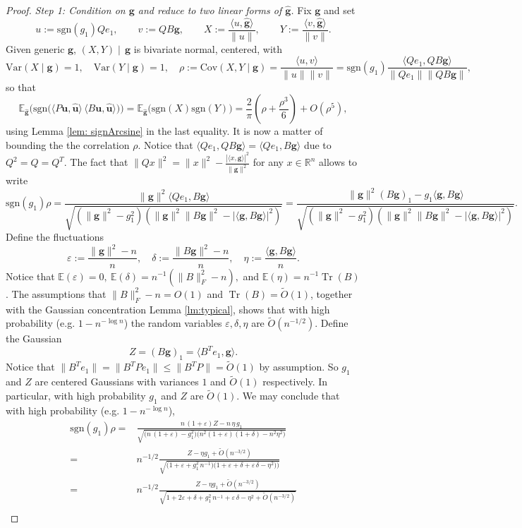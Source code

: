 \documentclass[reqno]{amsart}
\numberwithin{equation}{section}
\newcommand\E{\mathbb{E}}
\newcommand\R{\mathbb{R}}
\newcommand\bg{\bm{g}}
\newcommand\hg{\hat{\bm g}}
\newcommand\rem{\tilde{O}\left(n^{-3/2}\right)}
\newcommand\bu{\bm{u}}
\newcommand\hu{\hat{\bm u}}
\newcommand\eps{\varepsilon}
\newcommand\Tr{{\operatorname{Tr}}}
\newcommand{\Var}{\mathrm{Var}}
\newcommand{\Cov}{\mathrm{Cov}}
\begin{document}
\begin{proof}
\emph{Step 1: Condition on $\bg$ and reduce to two linear forms of $\hg$.}
Fix $\bg$ and set
\[
u:=\mathrm{sgn}(g_1)Qe_1,\qquad v:=QB\bg, \qquad
X:=\frac{\langle u,\hg\rangle}{\|u\|},\qquad
Y:=\frac{\langle v,\hg\rangle}{\|v\|}.
\]
Given generic $\bg$, $(X,Y)\mid\,\bg$ is bivariate normal, centered, with
\[
\Var(X\mid \bg)=1,\quad \Var(Y\mid \bg)=1,\quad
\rho:=\Cov(X,Y\mid \bg)=\frac{\langle u,v\rangle}{\|u\|\|v\|}=\mathrm{sgn}(g_1)\frac{\langle Qe_1,QB\bg\rangle}{\|Qe_1\|\|QB\bg\|},
\]
so that 
\[\E_{\hg}\big(\mathrm{sgn}\!\big(\langle P\bu,\hu\rangle\,\langle B\bu,\hu\rangle\big)\big)=\E_{\hg}\big(\mathrm{sgn}(X)\mathrm{sgn}(Y)\big)=\frac{2}{\pi}\left(\rho+\frac{\rho^3}{6}\right)+O(\rho^5),\]
using Lemma \ref{lem: signArcsine} in the last equality. It is now a matter of bounding the the correlation \(\rho\). Notice that $\langle Qe_1,QB\bg\rangle=\langle Qe_1,B\bg\rangle$ due to $Q^2=Q=Q^T$. The fact that $\|Qx\|^2=\|x\|^2-\frac{|\langle x,\bg\rangle|^2}{\|\bg\|^2}$ for any $x\in\R^n$ allows to write
\[
\mathrm{sgn}(g_{1})\rho
=\frac{\|\bg\|^2\langle Qe_1,B\bg\rangle}{\sqrt{(\|\bg\|^2-g_{1}^2)(\|\bg\|^2\|B\bg\|^2-|\langle \bg,B\bg\rangle|^2)}}
=\frac{\|\bg\|^2(B\bg)_1-g_{1}\langle \bg,B\bg\rangle}{\sqrt{(\|\bg\|^2-g_{1}^2)(\|\bg\|^2\|B\bg\|^2-|\langle \bg,B\bg\rangle|^2)}}.
\]
Define the fluctuations 
\[\eps:=\frac{\|\bg\|^2-n}{n},\quad \delta:=\frac{\|B\bg\|^2-n}{n},\quad \eta:=\frac{\langle\bg,B\bg\rangle}{n}.\]
Notice that $\E(\eps)=0,\ \E(\delta)=n^{-1}(\|B\|_{F}^2-n),$ and $\E(\eta)=n^{-1}\Tr(B)$. The assumptions that $\|B\|_{F}^2-n=O(1)$ and $\Tr(B)=\tilde{O}(1)$, together with the Gaussian concentration Lemma \ref{lm:typical}, shows that with high probability (e.g. $1-n^{-\log n}$) the random variables $\eps,\delta,\eta$ are $\tilde{O}(n^{-1/2})$. Define the Gaussian 
\[Z=(B\bg)_1=\langle B^Te_1,\bg\rangle.\]
Notice that $\|B^Te_1\|=\|B^TPe_1\|\le\|B^TP\|=\tilde{O}(1)$ by assumption. So $g_1$ and $Z$ are centered Gaussians with variances $1$ and $\tilde{O}(1)$ respectively. In particular, with high probability $g_1$ and $Z$ are $\tilde{O}(1)$. We may conclude that with high probability (e.g. $1-n^{-\log n}$),
\begin{align*}
\mathrm{sgn}(g_{1})\rho=& \frac{n\,(1+\eps)Z-n\,\eta\, g_1}{\sqrt{\big(n\,(1+\eps)-g_1^2\big)\big(n^2(1+\eps)(1+\delta)-n^2\eta^2\big)}}\\
= &    n^{-1/2}\frac{Z-\eta g_1+\rem}{\sqrt{\big(1+\eps+g_{1}^2\,n^{-1}\big)\big(1+\eps+\delta+\eps\,\delta-\eta^2)\big)}}\\
= &    n^{-1/2}\frac{Z-\eta g_1+\rem}{\sqrt{1+2\eps+\delta+g_{1}^2\,n^{-1}+\eps\,\delta-\eta^2+\rem}}\\

\end{align*}
\end{proof}
\end{document}
